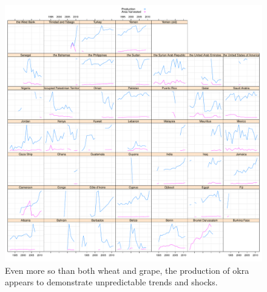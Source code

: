 \documentclass[nojss]{jss}\usepackage[]{graphicx}\usepackage[]{color}
\makeatletter
\def\maxwidth{ %
  \ifdim\Gin@nat@width>\linewidth
    \linewidth
  \else
    \Gin@nat@width
  \fi
}
\newenvironment{knitrout}{}{} %
\makeatother
\begin{document}
\begin{knitrout}
\color{fgcolor}\begin{figure}[!ht]


{\centering \includegraphics[width=\maxwidth]{figure/okra-production-area-explore} 

}

\caption[Even more so than both wheat and grape, the production of okra appears to demonstrate unpredictable trends and shocks]{Even more so than both wheat and grape, the production of okra appears to demonstrate unpredictable trends and shocks.\label{fig:okra-production-area-explore}}
\end{figure}


\end{knitrout}
\end{document}
